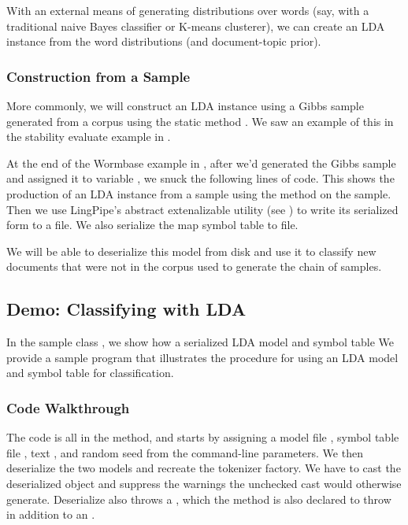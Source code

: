 With an external means of generating distributions over words (say,
with a traditional naive Bayes classifier or K-means clusterer), we
can create an LDA instance from the word distributions (and
document-topic prior).

\subsubsection{Construction from a Sample}

More commonly, we will construct an LDA instance using a Gibbs sample
generated from a corpus using the static method .
We saw an example of this in the stability evaluate example in
.  

At the end of the Wormbase example in , after we'd generated
the Gibbs sample and assigned it to variable , we snuck
the following lines of code.
%
%
This shows the production of an LDA instance from a sample using the
 method on the sample.  Then we use LingPipe's abstract
extenalizable utility (see ) to
write its serialized form to a file.  We also serialize the map symbol
table to file.

We will be able to deserialize this model from disk and use it to
classify new documents that were not in the corpus used to generate
the chain of samples.

\subsection{Demo: Classifying with LDA}

In the sample class , we show how a serialized LDA
model and symbol table We provide a sample program that illustrates
the procedure for using an LDA model and symbol table for classification.

\subsubsection{Code Walkthrough}

The code is all in the  method, and starts by assigning a
model file , symbol table file ,
text , and random seed  from the
command-line parameters.  We then deserialize the two models and
recreate the tokenizer factory.
%
%
We have to cast the deserialized object and suppress the warnings the
unchecked cast would otherwise generate.  Deserialize also throws a
, which the  method is also
declared to throw in addition to an .


